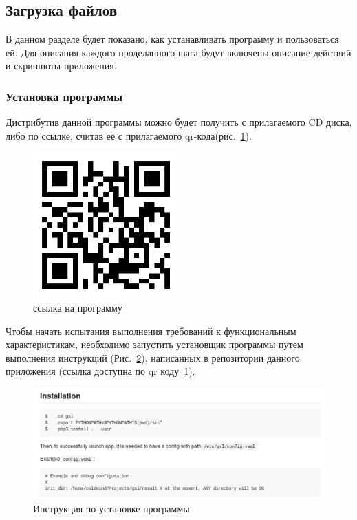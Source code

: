 \subsection{Загрузка файлов}
В данном разделе будет показано, как устанавливать программу и пользоваться ей.
Для описания каждого проделанного шага будут включены описание действий и
скриншоты приложения.

\subsubsection{Установка программы}
Дистрибутив данной программы можно будет получить с прилагаемого CD диска, либо
по ссылке, считав ее с прилагаемого qr-кода(рис.~\ref{ref}).

\begin{figure}[h!]
    \centering
    \includegraphics[width=0.5\textwidth]{./screenshots/qr.png}
    \caption{ссылка на программу}
    \label{ref}
\end{figure}

Чтобы начать испытания выполнения требований к функциональным характеристикам,
необходимо запустить установщик программы путем выполнения инструкций
(Рис.~\ref{install}), написанных в репозитории данного приложения (ссылка
доступна по qr коду~\ref{ref}).

\begin{figure}[h!]
    \centering
    \includegraphics[width=\textwidth]{./screenshots/installation.png}
    \caption{Инструкция по установке программы}\label{install}
\end{figure}

